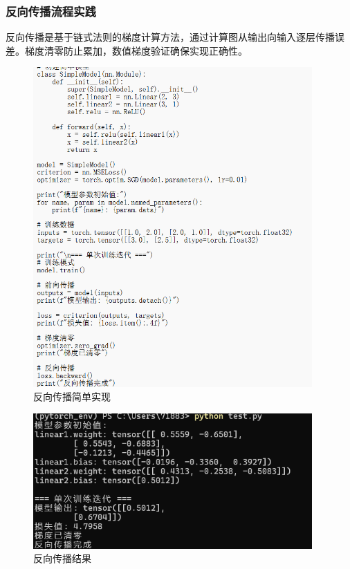\documentclass[UTF8]{ctexart}
\begin{document}
\subsubsection{反向传播流程实践}
反向传播是基于链式法则的梯度计算方法，通过计算图从输出向输入逐层传播误差。梯度清零防止累加，数值梯度验证确保实现正确性。
\begin{figure}[H]
    \centering
    \includegraphics[width=0.95\textwidth]{picture/反向传播简单实现.png}%
    \caption{反向传播简单实现}
\end{figure}

\begin{figure}[H]
    \centering
    \includegraphics[width=0.95\textwidth]{picture/反向传播结果.png}%
    \caption{反向传播结果}
\end{figure}
\end{document}
